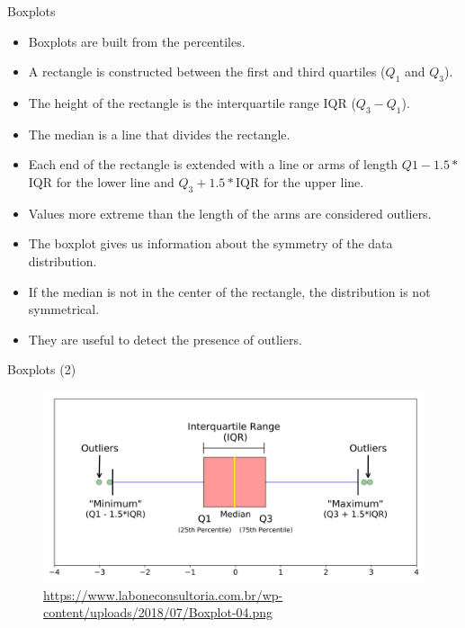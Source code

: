 \documentclass[handout]{beamer}
\begin{document}
\begin{frame}[fragile]{Boxplots}
\scriptsize{
\begin{itemize}
 \item Boxplots are built from the percentiles. 
 \item A rectangle is constructed between the first and third quartiles ($Q_1$ and $Q_3$).
 \item The height of the rectangle is the interquartile range IQR ($Q_3 - Q_1$).
 \item The median is a line that divides the rectangle.
 \item Each end of the rectangle is extended with a line or arms of length $Q1-1.5*$IQR for the lower line and $Q_3+1.5*$IQR for the upper line.
 \item Values more extreme than the length of the arms are considered outliers.
 
 \item The boxplot gives us information about the symmetry of the data distribution.
  \item If the median is not in the center of the rectangle, the distribution is not symmetrical.
 \item They are useful to detect the presence of outliers.
 
\end{itemize}



}
\end{frame}


\begin{frame}{Boxplots (2)}
\begin{figure}[h!]
	\centering
	\includegraphics[scale=0.1]{pics/boxplot.png}
	\caption{\url{https://www.laboneconsultoria.com.br/wp-content/uploads/2018/07/Boxplot-04.png}}
	
\end{figure} 
\end{frame}
\end{document}
